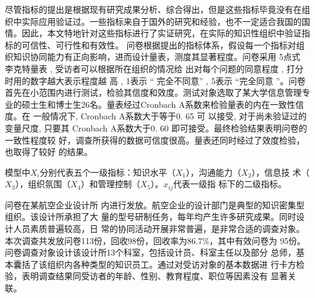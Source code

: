 \documentclass[adobefonts,UTF8]{ctexart}
\begin{document}
尽管指标的提出是根据现有研究成果分析、综合得出，但是这些指标毕竟没有在组织中实际应用验证过。一些指标来自于国外的研究和经验，也不一定适合我国的国情。因此，本文特地针对这些指标进行了实证研究，在实际的知识性组织中验证指标的可信性、可行性和有效性。
问卷根据提出的指标体系，假设每一个指标对组
织知识协同能力有正向影响，进而设计量表，测度其显著程度。问卷采用 5点式
李克特量表 , 受访者可以根据所在组织的情况给
出对每个问题的同意程度 , 打分时用的数字越大表示程度越
高 , 1表示 “ 完全不同意” , 5表示 “完全同意 ”。问卷首先在小范围内进行测试，检验其信度和效度。测试对象选取了某大学信息管理专业的硕士生和博士生26名。量表经过Cronbach A系数来检验量表的内在一致性信度。在
一般情况下, Cronbach A系数大于等于0. 65 可
以接受, 对于尚未验证过的变量尺度, 只要其
Cronbach A系数大于0. 60 即可接受。最终检验结果表明问卷的一致性程度较
好，调查所获得的数据可信度很高。量表还同时经过了效度检验，也取得了较好
的结果。

模型中$X_i$分别代表五个一级指标：知识水平（$X_1$），沟通能力（$X_2$），信息技
术（$X_3$），组织氛围（$X_4$）和管理控制（$X_5$）。$x_{ij}$代表一级指
标下的二级指标。

问卷在某航空企业设计所
内进行发放。航空企业的设计部门是典型的知识密集型组织。该设计所承担了大
量的型号研制任务，每年均产生许多研究成果。同时设计人员素质普遍较高，日
常的协同活动开展非常普遍，是非常合适的调查对象。本次调查共发放问卷113份，回收98份，回收率为86.7\%，其中有效问卷为
95份。问卷调查对象设计该设计所13个科室，包括设计员、科室主任以及部分
总师，基本囊括了该组织内各种类型的知识员工。通过对受访对象的基本数据进
行卡方检验，表明调查结果同受访者的年龄、性别、教育程度、职位等因素没有
显著关联。
\end{document}
